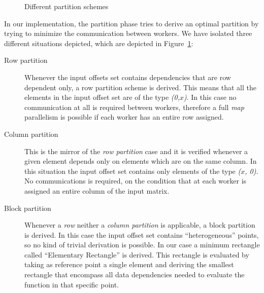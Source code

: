 \begin{figure}[!h]
  \hfill
  \hfill
  \caption{Different partition schemes}
  \label{fig:part-scheme}
\end{figure}


In our implementation, the partition phase tries to derive an optimal
partition by trying to minimize the communication between workers. We
have isolated three different situations depicted, which are depicted in
Figure~\ref{fig:part-scheme}:

\begin{description}
  \item[Row partition] Whenever the input offsets set contains
    dependencies that are row dependent only, a row partition scheme is
    derived. This means that all the elements in the input offset set
    are of the type \emph{(0,$x$)}. In this case no communication at
    all is required between workers, therefore a full \emph{map}
    parallelism is possible if each worker has an entire row
    assigned.

  \item[Column partition] This is the mirror of the \emph{row partition}
    case and it is verified whenever a given element depends only on
    elements which are on the same column. In this situation the input
    offset set contains only elements of the type \emph{($x$, 0)}. No
    communications is required, on the condition that at each worker is
    assigned an entire column of the input matrix.

  \item[Block partition] Whenever a \emph{row} neither a \emph{column
    partition} is applicable, a block partition is derived. In this case
    the input offset set contains ``heterogeneous'' points, so no kind
    of trivial derivation is possible. In our case a minimum rectangle
    called ``Elementary Rectangle'' is derived. This rectangle is
    evaluated by taking as reference point a single element and deriving
    the smallest rectangle that encompass all data dependencies needed to
    evaluate the function in that specific point.
\end{description}

